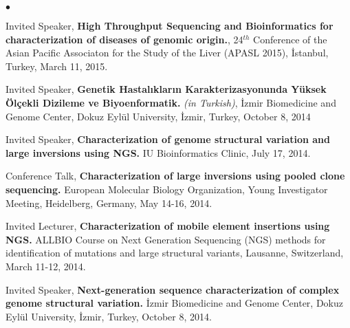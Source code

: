 \documentclass[margin,line]{res}
\newenvironment{list2}{
  \begin{list}{$\bullet$}{%
      \setlength{\itemsep}{0in}
      \setlength{\parsep}{0in} \setlength{\parskip}{0in}
      \setlength{\topsep}{0in} \setlength{\partopsep}{0in} 
      \setlength{\leftmargin}{0.2in}}}{\end{list}}
\begin{document}
\begin{resume}
\begin{list2}
\item
  Invited Speaker, 
  {\bf High Throughput Sequencing and Bioinformatics for characterization of diseases of genomic origin.},
  24$^{th}$ Conference of the Asian Pacific Associaton for the Study of the Liver (APASL 2015), İstanbul, Turkey, March 11, 2015.
\item
  Invited Speaker, 
  {\bf Genetik Hastalıkların Karakterizasyonunda Yüksek Ölçekli Dizileme ve Biyoenformatik.} {\it (in Turkish)},
  İzmir Biomedicine and Genome Center, Dokuz Eylül University, İzmir, Turkey, October 8, 2014

\item
  Invited Speaker, 
  {\bf Characterization of  genome structural variation and large inversions using NGS.}
  IU Bioinformatics Clinic, July 17, 2014. 
\item
  Conference Talk, 
  {\bf Characterization of large inversions using pooled clone sequencing.}
  European Molecular Biology Organization, Young Investigator Meeting, Heidelberg, Germany, May 14-16, 2014.
\clearpage
\item
  Invited Lecturer, 
  {\bf Characterization of mobile element insertions using NGS.}
  ALLBIO Course on Next Generation Sequencing (NGS) methods for identification of mutations and large structural variants,
  Lausanne, Switzerland, March 11-12, 2014.
\item
  Invited Speaker, 
  {\bf  Next-generation sequence characterization of complex genome structural variation.}
  İzmir Biomedicine and Genome Center, Dokuz Eylül University, İzmir, Turkey, October 8, 2014.


\end{list2}
\end{resume}
\end{document}
